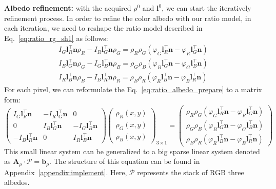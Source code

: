 \textbf{Albedo refinement:}
with the acquired $\rho^{0}$ and $\mathbf{l}^{0}$, we can start the iteratively refinement process.
In order to refine the color albedo with our ratio model, in each iteration, we need to reshape the ratio model described in Eq.~\ref{eq:ratio_rg_sh1} as follows:
\begin{equation}\label{eq:ratio_albedo_prepare}
\begin{split}
I_G \mathbf{l}_R^\top\mathbf{n} \rho_R - I_R \mathbf{l}_G^\top\mathbf{n} \rho_G  = \rho_R \rho_G (\varphi_G\mathbf{l}_R^\top \mathbf{n} - \varphi_R\mathbf{l}_G^\top \mathbf{n})\\
I_B \mathbf{l}_G^\top\mathbf{n} \rho_G - I_G \mathbf{l}_B^\top\mathbf{n} \rho_B  = \rho_G \rho_B (\varphi_B\mathbf{l}_G^\top \mathbf{n} - \varphi_G\mathbf{l}_B^\top \mathbf{n})\\
I_R \mathbf{l}_B^\top\mathbf{n} \rho_B - I_B \mathbf{l}_R^\top\mathbf{n} \rho_R  = \rho_B \rho_R (\varphi_R\mathbf{l}_B^\top \mathbf{n} - \varphi_B\mathbf{l}_R^\top \mathbf{n})
\end{split}
\end{equation}
For each pixel, we can reformulate the Eq.~\ref{eq:ratio_albedo_prepare} to a matrix form:
\begin{equation}\label{eq:rho_matrix}
    \begin{pmatrix}
        I_G \mathbf{l}_R^\top\mathbf{n} & - I_R \mathbf{l}_G^\top\mathbf{n} & 0 \\
        0 & I_B \mathbf{l}_G^\top\mathbf{n} & - I_G \mathbf{l}_B^\top\mathbf{n} \\
        - I_B \mathbf{l}_R^\top\mathbf{n} & 0 & I_R \mathbf{l}_B^\top\mathbf{n} 
    \end{pmatrix}
    \begin{pmatrix}
        \rho_R(x,y)\\
        \rho_G(x,y)\\
        \rho_B(x,y)
     \end{pmatrix}_{3 \times 1}
    =
    \begin{pmatrix}
        \rho_R \rho_G (\varphi_G\mathbf{l}_R^\top \mathbf{n} - \varphi_R\mathbf{l}_G^\top \mathbf{n})\\
        \rho_G \rho_B (\varphi_B\mathbf{l}_G^\top \mathbf{n} - \varphi_G\mathbf{l}_B^\top \mathbf{n})\\
        \rho_B \rho_R (\varphi_R\mathbf{l}_B^\top \mathbf{n} - \varphi_B\mathbf{l}_R^\top \mathbf{n})
    \end{pmatrix}
\end{equation}
This small linear system can be generalized to a big sparse linear system denoted as $\mathbf{A}_{\rho}\cdot {\mathcal{P}} = \mathbf{b}_{\rho}$.
The structure of this equation can be found in Appendix~\ref{appendix:implement}.
Here, $\mathcal{P}$ represents the stack of RGB three albedos.

